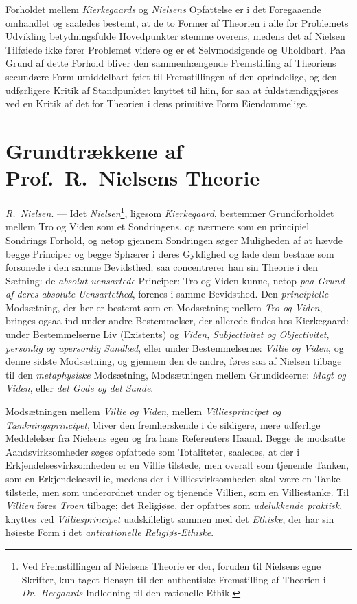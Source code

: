 \documentclass[12pt,a4paper]{book}
\newcommand{\opage}[1]{\marginnote{\footnotesize\textit{[#1]}}}
\begin{document}
Forholdet mellem \emph{Kierkegaards} og \emph{Nielsens} Opfattelse er i det
Foregaaende omhandlet og saaledes bestemt, at de to Former af Theorien
i alle for Problemets Udvikling betydningsfulde Hovedpunkter stemme
overens, medens det af Nielsen Tilføiede ikke fører Problemet videre
og er et Selvmodsigende og Uholdbart. Paa Grund af dette Forhold bliver
den sammenhængende Fremstilling af Theoriens secundære Form
umiddelbart føiet til Fremstillingen af den oprindelige, og den
udførligere Kritik af Standpunktet knyttet til hiin, for saa at
fuldstændiggjøres ved en Kritik af det for Theorien i dens primitive
Form Eiendommelige.

\section{Grundtrækkene af Prof.\ R.\ Nielsens Theorie}
\label{sec:nielsen-theorie}

\emph{R.\ Nielsen}. --- Idet \emph{Nielsen}\footnote{Ved Fremstillingen af Nielsens Theorie er der, foruden til Nielsens
egne Skrifter, kun taget Hensyn til den authentiske Fremstilling af Theorien i \textit{Dr.}\ \emph{Heegaards} Indledning til den rationelle Ethik.}, ligesom \emph{Kierkegaard}, bestemmer
Grundforholdet mellem Tro og Viden som et Sondringens, og nærmere som en principiel Sondrings
Forhold, og netop gjennem Sondringen søger Muligheden af at hævde
begge Principer og begge Sphærer i deres Gyldighed og lade dem bestaae
som forsonede i den samme Bevidsthed; saa concentrerer han sin Theorie
i den Sætning: de \emph{absolut uensartede} Principer: Tro og Viden kunne, netop \emph{paa Grund af deres absolute Uensartethed}, forenes i samme Bevidsthed. Den \emph{principielle} Modsætning, der her er bestemt som en
Modsætning mellem \emph{Tro og Viden}, bringes ogsaa ind under andre
Bestemmelser, der allerede findes hos Kierkegaard: under Bestemmelserne
Liv (Existents) og \emph{Viden}, \emph{Subjectivitet og Objectivitet}, \emph{personlig og
upersonlig Sandhed}, eller under Bestemmelserne: \emph{Villie og Viden}, og denne
\opage{127}sidste Modsætning, og gjennem den de andre, føres saa af
Nielsen tilbage til den \emph{metaphysiske} Modsætning, Modsætningen mellem
Grundideerne: \emph{Magt og Viden}, eller \emph{det Gode og det Sande}.

Modsætningen mellem \emph{Villie og Viden}, mellem \emph{Villiesprincipet og
Tænkningsprincipet}, bliver den fremherskende i de sildigere, mere
udførlige Meddelelser fra Nielsens egen og fra hans Referenters Haand.
Begge de modsatte Aandsvirksomheder søges opfattede som Totaliteter,
saaledes, at der i Erkjendelsesvirksomheden er en Villie tilstede, men
overalt som tjenende Tanken, som en Erkjendelsesvillie, medens der i
Villiesvirksomheden skal være en Tanke tilstede, men som underordnet
under og tjenende Villien, som en Villiestanke. Til \emph{Villien} føres \emph{Troen} tilbage; det Religiøse, der opfattes som \emph{udelukkende praktisk}, knyttes ved \emph{Villiesprincipet} uadskilleligt sammen med det \emph{Ethiske}, der
har sin høieste Form i det \emph{antirationelle Religiøs-Ethiske}.
\end{document}
